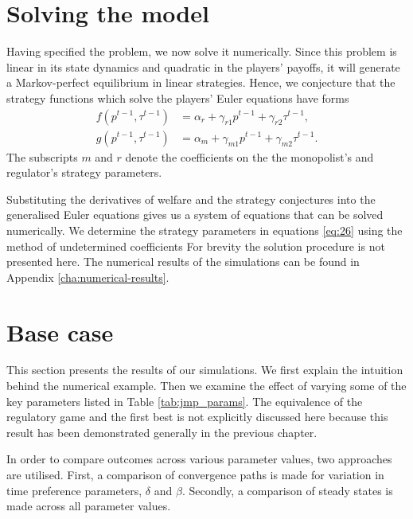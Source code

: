 \section{Solving the model}

\label{sec:solving-model}

Having specified the problem, we now solve it numerically. Since this
problem is linear in its state dynamics and quadratic in the players'
payoffs, it will generate a Markov-perfect equilibrium in linear strategies.
Hence, we conjecture that the strategy functions which solve the players'
Euler equations have forms 
\begin{align}
f(p^{t-1},\tau ^{t-1})& =\alpha _{r}+\gamma _{r1}p^{t-1}+\gamma _{r2}\tau
^{t-1},  \label{eq:26} \\
g(p^{t-1},\tau ^{t-1})& =\alpha _{m}+\gamma _{m1}p^{t-1}+\gamma _{m2}\tau
^{t-1}.
\end{align}%
The subscripts $m$ and $r$ denote the coefficients on the the monopolist's
and regulator's strategy parameters.

Substituting the derivatives of welfare and the strategy conjectures into
the generalised Euler equations gives us a system of equations that can be
solved numerically. We determine the strategy parameters in equations %
\eqref{eq:26} using the method of undetermined coefficients For brevity the
solution procedure is not presented here. The numerical results of the
simulations can be found in Appendix \ref{cha:numerical-results}.

\section{Base case}

\label{sec:base-case}

This section presents the results of our simulations. We first explain the
intuition behind the numerical example. Then we examine the effect of
varying some of the key parameters listed in Table \ref{tab:jmp_params}. The
equivalence of the regulatory game and the first best is not explicitly
discussed here because this result has been demonstrated generally in the
previous chapter.

In order to compare outcomes across various parameter values, two approaches
are utilised. First, a comparison of convergence paths is made for variation
in time preference parameters, $\delta$ and $\beta$. Secondly, a comparison
of steady states is made across all parameter values.

